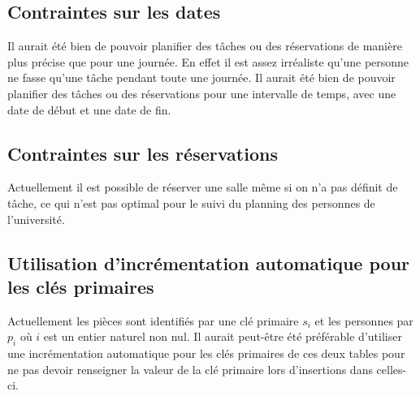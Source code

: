 \subsection{Contraintes sur les dates}
Il aurait été bien de pouvoir planifier des tâches ou des réservations de manière plus précise que pour une journée. En effet il est assez irréaliste qu'une personne ne fasse qu'une tâche pendant toute une journée. Il aurait été bien de pouvoir planifier des tâches ou des réservations pour une intervalle de temps, avec une date de début et une date de fin. 

\subsection{Contraintes sur les réservations}
Actuellement il est possible de réserver une salle même si on n'a pas définit de tâche, ce qui n'est pas optimal pour le suivi du planning des personnes de l'université.

\subsection{Utilisation d'incrémentation automatique pour les clés primaires}
Actuellement les pièces sont identifiés par une clé primaire $s_{i}$ et les personnes par $p_{i}$ où $i$ est un entier naturel non nul. Il aurait peut-être été préférable d'utiliser une incrémentation automatique pour les clés primaires de ces deux tables pour ne pas devoir renseigner la valeur de la clé primaire lors d'insertions dans celles-ci.